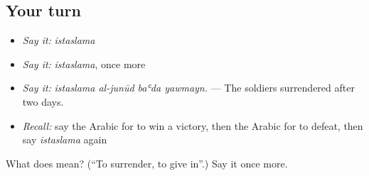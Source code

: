 \subsection*{Your turn}
\begin{itemize}
\raggedright
  \item \emph{Say it:} \emph{istaslama}
  \item \emph{Say it:} \emph{istaslama}, once more
  \item \emph{Say it:} \emph{istaslama al-junūd baʿda yawmayn.} — The soldiers surrendered after two days.
  \item \emph{Recall:} say the Arabic for to win a victory, then the Arabic for to defeat, then say \emph{istaslama} again
\end{itemize}

\begin{tcolorbox}[breakable,colback=teal!4,colframe=teal!35!black,title={Before you move on}]
What does  mean? (\textquotedblleft{}To surrender, to give in\textquotedblright{}.) Say it once more.
\end{tcolorbox}
